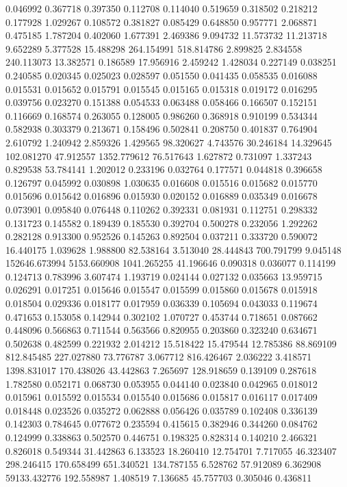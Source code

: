 0.046992
0.367718
0.397350
0.112708
0.114040
0.519659
0.318502
0.218212
0.177928
1.029267
0.108572
0.381827
0.085429
0.648850
0.957771
2.068871
0.475185
1.787204
0.402060
1.677391
2.469386
9.094732
11.573732
11.213718
9.652289
5.377528
15.488298
264.154991
518.814786
2.899825
2.834558
240.113073
13.382571
0.186589
17.956916
2.459242
1.428034
0.227149
0.038251
0.240585
0.020345
0.025023
0.028597
0.051550
0.041435
0.058535
0.016088
0.015531
0.015652
0.015791
0.015545
0.015165
0.015318
0.019172
0.016295
0.039756
0.023270
0.151388
0.054533
0.063488
0.058466
0.166507
0.152151
0.116669
0.168574
0.263055
0.128005
0.986260
0.368918
0.910199
0.534344
0.582938
0.303379
0.213671
0.158496
0.502841
0.208750
0.401837
0.764904
2.610792
1.240942
2.859326
1.429565
98.320627
4.743576
30.246184
14.329645
102.081270
47.912557
1352.779612
76.517643
1.627872
0.731097
1.337243
0.829538
53.784141
1.202012
0.233196
0.032764
0.177571
0.044818
0.396658
0.126797
0.045992
0.030898
1.030635
0.016608
0.015516
0.015682
0.015770
0.015696
0.015642
0.016896
0.015930
0.020152
0.016889
0.035349
0.016678
0.073901
0.095840
0.076448
0.110262
0.392331
0.081931
0.112751
0.298332
0.131723
0.145582
0.189439
0.185530
0.392704
0.500278
0.232056
1.292262
0.282128
0.913300
0.952526
0.145263
0.892504
0.037211
0.333720
0.590072
16.440175
1.039628
1.988800
82.538164
3.513040
28.444843
700.791799
9.045148
152646.673994
5153.660908
1041.265255
41.196646
0.090318
0.036077
0.114199
0.124713
0.783996
3.607474
1.193719
0.024144
0.027132
0.035663
13.959715
0.026291
0.017251
0.015646
0.015547
0.015599
0.015860
0.015678
0.015918
0.018504
0.029336
0.018177
0.017959
0.036339
0.105694
0.043033
0.119674
0.471653
0.153058
0.142944
0.302102
1.070727
0.453744
0.718651
0.087662
0.448096
0.566863
0.711544
0.563566
0.820955
0.203860
0.323240
0.634671
0.502638
0.482599
0.221932
2.014212
15.518422
15.479544
12.785386
88.869109
812.845485
227.027880
73.776787
3.067712
816.426467
2.036222
3.418571
1398.831017
170.438026
43.442863
7.265697
128.918659
0.139109
0.287618
1.782580
0.052171
0.068730
0.053955
0.044140
0.023840
0.042965
0.018012
0.015961
0.015592
0.015534
0.015540
0.015686
0.015817
0.016117
0.017409
0.018448
0.023526
0.035272
0.062888
0.056426
0.035789
0.102408
0.336139
0.142303
0.784645
0.077672
0.235594
0.415615
0.382946
0.344260
0.084762
0.124999
0.338863
0.502570
0.446751
0.198325
0.828314
0.140210
2.466321
0.826018
0.549344
31.442863
6.133523
18.260410
12.754701
7.717055
46.323407
298.246415
170.658499
651.340521
134.787155
6.528762
57.912089
6.362908
59133.432776
192.558987
1.408519
7.136685
45.757703
0.305046
0.436811
